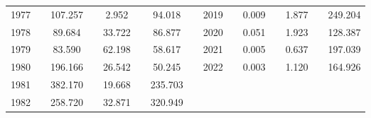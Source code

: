 \begin{table}[]
\begin{tabular}{clccccccclccccc}
1977 &  & 107.257 &  & 2.952 &  & 94.018 &  & 2019 &  & 0.009 &  & 1.877 &  & 249.204 \\
1978 &  & 89.684 &  & 33.722 &  & 86.877 &  & 2020 &  & 0.051 &  & 1.923 &  & 128.387 \\
1979 &  & 83.590 &  & 62.198 &  & 58.617 &  & 2021 &  & 0.005 &  & 0.637 &  & 197.039 \\
1980 &  & 196.166 &  & 26.542 &  & 50.245 &  & 2022 &  & 0.003 &  & 1.120 &  & 164.926 \\
1981 &  & 382.170 &  & 19.668 &  & 235.703 &  &  &  & \multicolumn{1}{l}{} & \multicolumn{1}{l}{} & \multicolumn{1}{l}{} & \multicolumn{1}{l}{} & \multicolumn{1}{l}{} \\
1982 &  & 258.720 &  & 32.871 &  & 320.949 &  &  &  & \multicolumn{1}{l}{} & \multicolumn{1}{l}{} & \multicolumn{1}{l}{} & \multicolumn{1}{l}{} & \multicolumn{1}{l}{} \\ \hline
\end{tabular}
\end{table}
\endgroup{}
\endgroup{}
